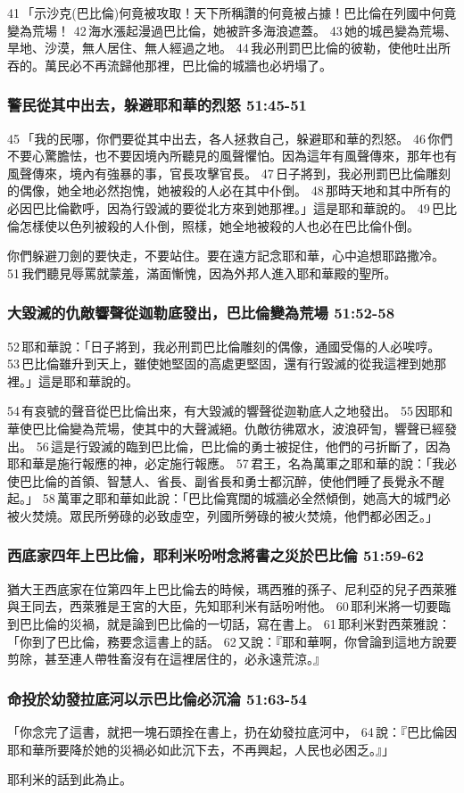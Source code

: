 41 「示沙克(巴比倫)何竟被攻取！天下所稱讚的何竟被占據！巴比倫在列國中何竟變為荒場！ 42 海水漲起漫過巴比倫，她被許多海浪遮蓋。 43 她的城邑變為荒場、旱地、沙漠，無人居住、無人經過之地。 44 我必刑罰巴比倫的彼勒，使他吐出所吞的。萬民必不再流歸他那裡，巴比倫的城牆也必坍塌了。


\subsubsection{警民從其中出去，躲避耶和華的烈怒 51:45-51}
45 「我的民哪，你們要從其中出去，各人拯救自己，躲避耶和華的烈怒。 46 你們不要心驚膽怯，也不要因境內所聽見的風聲懼怕。因為這年有風聲傳來，那年也有風聲傳來，境內有強暴的事，官長攻擊官長。 47 日子將到，我必刑罰巴比倫雕刻的偶像，她全地必然抱愧，她被殺的人必在其中仆倒。 48 那時天地和其中所有的必因巴比倫歡呼，因為行毀滅的要從北方來到她那裡。」這是耶和華說的。 49 巴比倫怎樣使以色列被殺的人仆倒，照樣，她全地被殺的人也必在巴比倫仆倒。

你們躲避刀劍的要快走，不要站住。要在遠方記念耶和華，心中追想耶路撒冷。 51 我們聽見辱罵就蒙羞，滿面慚愧，因為外邦人進入耶和華殿的聖所。 

\subsubsection{大毀滅的仇敵響聲從迦勒底發出，巴比倫變為荒場 51:52-58}
52 耶和華說：「日子將到，我必刑罰巴比倫雕刻的偶像，通國受傷的人必唉哼。 53 巴比倫雖升到天上，雖使她堅固的高處更堅固，還有行毀滅的從我這裡到她那裡。」這是耶和華說的。

54 有哀號的聲音從巴比倫出來，有大毀滅的響聲從迦勒底人之地發出。 55 因耶和華使巴比倫變為荒場，使其中的大聲滅絕。仇敵彷彿眾水，波浪砰訇，響聲已經發出。 56 這是行毀滅的臨到巴比倫，巴比倫的勇士被捉住，他們的弓折斷了，因為耶和華是施行報應的神，必定施行報應。 57 君王，名為萬軍之耶和華的說：「我必使巴比倫的首領、智慧人、省長、副省長和勇士都沉醉，使他們睡了長覺永不醒起。」 58 萬軍之耶和華如此說：「巴比倫寬闊的城牆必全然傾倒，她高大的城門必被火焚燒。眾民所勞碌的必致虛空，列國所勞碌的被火焚燒，他們都必困乏。」

\subsubsection{西底家四年上巴比倫，耶利米吩咐念將書之災於巴比倫 51:59-62}
猶大王西底家在位第四年上巴比倫去的時候，瑪西雅的孫子、尼利亞的兒子西萊雅與王同去，西萊雅是王宮的大臣，先知耶利米有話吩咐他。 60 耶利米將一切要臨到巴比倫的災禍，就是論到巴比倫的一切話，寫在書上。 61 耶利米對西萊雅說：「你到了巴比倫，務要念這書上的話。 62 又說：『耶和華啊，你曾論到這地方說要剪除，甚至連人帶牲畜沒有在這裡居住的，必永遠荒涼。』

\subsubsection{命投於幼發拉底河以示巴比倫必沉淪 51:63-54}
「你念完了這書，就把一塊石頭拴在書上，扔在幼發拉底河中， 64 說：『巴比倫因耶和華所要降於她的災禍必如此沉下去，不再興起，人民也必困乏。』」

耶利米的話到此為止。














